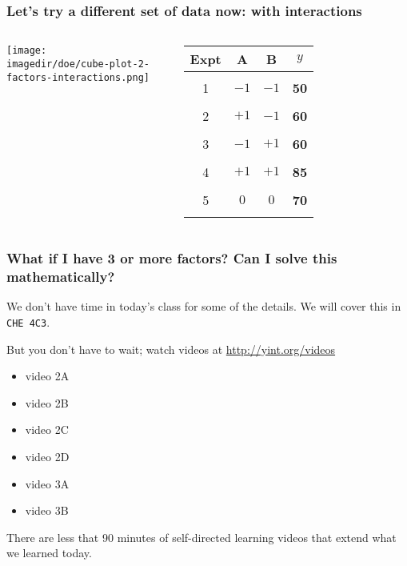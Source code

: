 \begin{frame}\frametitle{Let's try a different set of data now: with interactions}
	\begin{columns}[T]
			\centerline{\texttt{[image: \\imagedir/doe/cube-plot-2-factors-interactions.png]}}
			\begin{tabulary}{\linewidth}{c|c|c|c}
				Expt & \textbf{\relax A} & \textbf{\relax B} & \textbf{\relax $y$} \\ \hline &  &  & \\
				1 &{\color{blue}$-1$} & {\color{blue}$-1$}& {\color{myOrange}\textbf{50}}  \\ &  &  & \\
				2 &{\color{blue}$+1$} & {\color{blue}$-1$}& {\color{myOrange}\textbf{60}}  \\ &  &  & \\
				3 &{\color{blue}$-1$} & {\color{blue}$+1$}& {\color{myOrange}\textbf{60}}  \\ &  &  & \\
				4 &{\color{blue}$+1$} & {\color{blue}$+1$}& {\color{myOrange}\textbf{85}}  \\ &  &  & \\
				5 &{\color{blue}$0$ } & {\color{blue}$0$ }& {\color{myOrange}\textbf{70}}  \\ &  &  & \\
			\end{tabulary}
	\end{columns}
\end{frame}

\begin{frame}\frametitle{What if I have 3 or more factors? Can I solve this mathematically?}
	
	We don't have time in today's class for some of the details. We will cover this in \texttt{CHE 4C3}.
	
	\vspace{12pt}
	But you don't have to wait; watch videos at \href{http://yint.org/videos}{http://yint.org/videos}
	\begin{itemize}
		\item	video 2A
		\item	video 2B
		\item	video 2C
		\item	video 2D
		\item	video 3A
		\item	video 3B
	\end{itemize}
	
	\begin{exampleblock}{}
		There are less that 90 minutes of self-directed learning videos that extend what we learned today.
	\end{exampleblock}
	
\end{frame}

